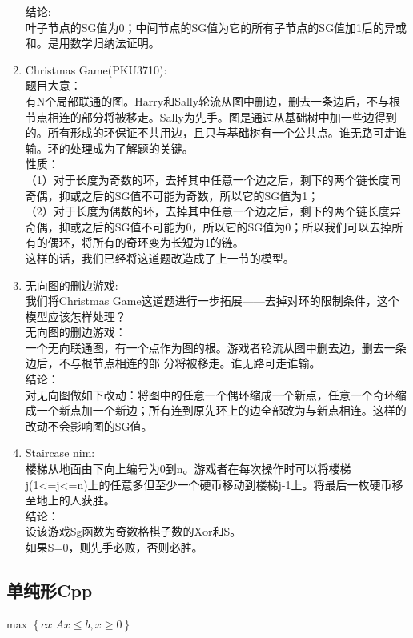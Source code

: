 \documentclass[landscape, twocolumn, 8pt, a4paper, twoside]{extarticle}
\begin{document}
\begin{spacing}{0.1}
\begin{enumerate}
		结论:\\
		叶子节点的SG值为0；中间节点的SG值为它的所有子节点的SG值加1后的异或和。是用数学归纳法证明。\\
	\item Christmas Game(PKU3710):\\
		题目大意：\\
		有N个局部联通的图。Harry和Sally轮流从图中删边，删去一条边后，不与根节点相连的部分将被移走。Sally为先手。图是通过从基础树中加一些边得到的。所有形成的环保证不共用边，且只与基础树有一个公共点。谁无路可走谁输。环的处理成为了解题的关键。\\
		性质：\\
		（1）对于长度为奇数的环，去掉其中任意一个边之后，剩下的两个链长度同奇偶，抑或之后的SG值不可能为奇数，所以它的SG值为1；\\
		（2）对于长度为偶数的环，去掉其中任意一个边之后，剩下的两个链长度异奇偶，抑或之后的SG值不可能为0，所以它的SG值为0；所以我们可以去掉所有的偶环，将所有的奇环变为长短为1的链。\\
		这样的话，我们已经将这道题改造成了上一节的模型。\\
	\item 无向图的删边游戏:\\
		我们将Christmas Game这道题进行一步拓展——去掉对环的限制条件，这个模型应该怎样处理？\\
		无向图的删边游戏：\\
		一个无向联通图，有一个点作为图的根。游戏者轮流从图中删去边，删去一条边后，不与根节点相连的部 分将被移走。谁无路可走谁输。 \\
		结论：\\
		对无向图做如下改动：将图中的任意一个偶环缩成一个新点，任意一个奇环缩成一个新点加一个新边；所有连到原先环上的边全部改为与新点相连。这样的改动不会影响图的SG值。\\
	\item Staircase nim:\\
		楼梯从地面由下向上编号为0到n。游戏者在每次操作时可以将楼梯j(1<=j<=n)上的任意多但至少一个硬币移动到楼梯j-1上。将最后一枚硬币移至地上的人获胜。\\
		结论：\\
		设该游戏Sg函数为奇数格棋子数的Xor和S。\\
		如果S=0，则先手必败，否则必胜。\\
\end{enumerate}

\subsection{单纯形Cpp}
max $\left \{ cx | Ax \le b, x \ge 0 \right \}$



\end{spacing}
\end{document}

